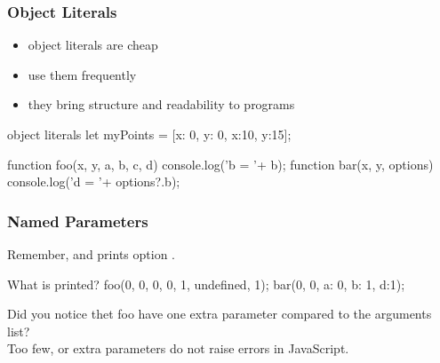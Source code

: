 \begin{frame}[fragile] \frametitle{Object Literals}
\begin{itemize}
  \item object literals are cheap
  \item use them frequently
  \item they bring structure and readability to programs
\end{itemize}
\begin{CodeBox}{object literals}
let myPoints = [{x: 0, y: 0}, {x:10, y:15}];

function foo(x, y, a, b, c, d) {
 console.log('b = '+ b);
}
function bar(x, y, options) {
 console.log('d = '+ options?.b);
}
\end{CodeBox}
\end{frame}

\begin{frame}[fragile] \frametitle{Named Parameters}
Remember,  and  prints option .
\vspace{5mm}
\begin{CodeBox}{What is printed?}
foo(0, 0, 0, 0, 1, undefined, 1);
bar(0, 0, {a: 0, b: 1, d:1});
\end{CodeBox}
\vspace{10mm}
Did you notice thet foo have one extra parameter compared to the arguments list?
\\ Too few, or extra parameters do not raise errors in JavaScript. 
\end{frame}

